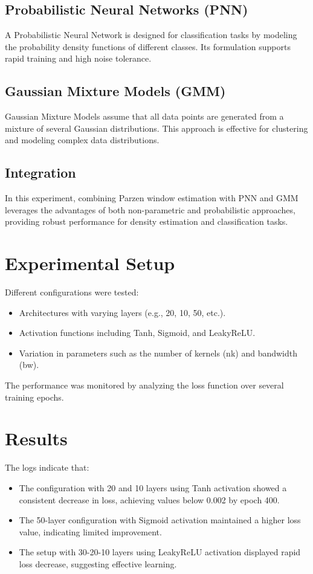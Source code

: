 \documentclass{article}
\begin{document}
\subsection{Probabilistic Neural Networks (PNN)}
A Probabilistic Neural Network is designed for classification tasks by modeling the probability density functions of different classes. Its formulation supports rapid training and high noise tolerance.

\subsection{Gaussian Mixture Models (GMM)}
Gaussian Mixture Models assume that all data points are generated from a mixture of several Gaussian distributions. This approach is effective for clustering and modeling complex data distributions.

\subsection{Integration}
In this experiment, combining Parzen window estimation with PNN and GMM leverages the advantages of both non-parametric and probabilistic approaches, providing robust performance for density estimation and classification tasks.

\section{Experimental Setup}
Different configurations were tested:
\begin{itemize}
    \item Architectures with varying layers (e.g., 20, 10, 50, etc.).
    \item Activation functions including Tanh, Sigmoid, and LeakyReLU.
    \item Variation in parameters such as the number of kernels (nk) and bandwidth (bw).
\end{itemize}
The performance was monitored by analyzing the loss function over several training epochs.

\section{Results}
The logs indicate that:
\begin{itemize}
    \item The configuration with 20 and 10 layers using Tanh activation showed a consistent decrease in loss, achieving values below 0.002 by epoch 400.
    \item The 50-layer configuration with Sigmoid activation maintained a higher loss value, indicating limited improvement.
    \item The setup with 30-20-10 layers using LeakyReLU activation displayed rapid loss decrease, suggesting effective learning.
\end{itemize}
\end{document}
